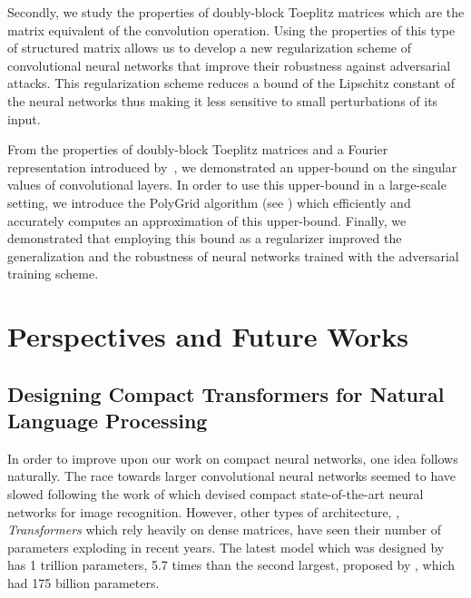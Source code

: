 Secondly, we study the properties of doubly-block Toeplitz matrices which are the matrix equivalent of the convolution operation. 
Using the properties of this type of structured matrix allows us to develop a new regularization scheme of convolutional neural networks that improve their robustness against adversarial attacks.
This regularization scheme reduces a bound of the Lipschitz constant of the neural networks thus making it less sensitive to small perturbations of its input.


%
%


From the properties of doubly-block Toeplitz matrices and a Fourier representation introduced by~\citet{grenander1958toeplitz}, we demonstrated an upper-bound on the singular values of convolutional layers.
In order to use this upper-bound in a large-scale setting, we introduce the PolyGrid algorithm (see ) which efficiently and accurately computes an approximation of this upper-bound.
Finally, we demonstrated that employing this bound as a regularizer improved the generalization and the robustness of neural networks trained with the adversarial training scheme.



\section{Perspectives and Future Works}
\label{section:ch6-perspectives_and_future_works}

\subsection{Designing Compact Transformers for Natural Language Processing}


In order to improve upon our work on compact neural networks, one idea follows naturally.
The race towards larger convolutional neural networks seemed to have slowed following the work of \citet{tan2019efficientnet} which devised compact state-of-the-art neural networks for image recognition.
However, other types of architecture, \eg, \emph{Transformers} which rely heavily on dense matrices, have seen their number of parameters exploding in recent years.
The latest model which was designed by \citet{fedus2021switch} has 1 trillion parameters, 5.7 times than the second largest, proposed by \citet{brown2020language}, which had 175 billion parameters.

